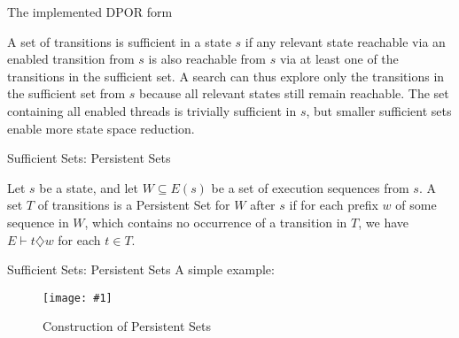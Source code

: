 \documentclass[9pt]{beamer}
\newcommand{\trace}[2]{
\begin{figure}[H]
\centering
\texttt{[image: \#1]}
\caption{#2}
\label{#2}
\end{figure}
}
\begin{document}
\begin{frame}{The implemented DPOR form}

\begin{figure}
    
\end{figure}

\end{frame}

\begin{frame}
\begin{definition}
A set of transitions is sufficient in a state $s$ if any relevant
state reachable via an enabled transition from $s$ is also reachable from $s$ via at least one of the transitions in the sufficient
set. A search can thus explore only the transitions in the
sufficient set from $s$ because all relevant states still remain
reachable. The set containing all enabled threads is trivially
sufficient in $s$, but smaller sufficient sets enable more state
space reduction.
\end{definition}
    
\end{frame}

\begin{frame}{Sufficient Sets: Persistent Sets}
    
\begin{definition}
Let $s$ be a state, and let $W \subseteq E(s)$ be a set
of execution sequences from $s$. A set $T$ of transitions is a Persistent Set for $W$
after $s$ if for each prefix $w$ of some sequence in $W$, which contains no occurrence
of a transition in $T$,  we have $E \vdash t \diamondsuit w$ for each $t \in T$.
\end{definition}
\end{frame}

\begin{frame}{Sufficient Sets: Persistent Sets}
A simple example:
    
\trace{../img/persistent.pdf}{Construction of Persistent Sets}
    
\end{frame}
\end{document}

